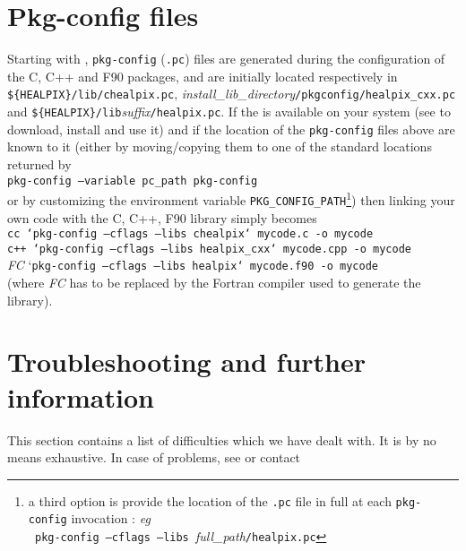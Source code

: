 \documentclass[12pt,twoside]{article}
\begin{document}
\section{Pkg-config files}
\label{sec:pkg-config}
Starting with , \texttt{pkg-config} (\texttt{.pc}) files are generated
during the configuration of the 
C, C++ and F90 packages, and are initially located respectively in
\texttt{\$\{HEALPIX\}/lib/chealpix.pc},
{\em install\_lib\_directory}\texttt{/pkgconfig/healpix\_cxx.pc}
and 
\texttt{\$\{HEALPIX\}/lib}{\em suffix}\texttt{/healpix.pc}.
If the 
is available on your system (see 
 to download, install and
use it) and if the location of
the \healpix \texttt{pkg-config} files above are known to it (either by moving/copying them
to one of the standard locations returned by \\
\texttt{pkg-config --variable pc\_path pkg-config}\\
or by customizing the environment variable \texttt{PKG\_CONFIG\_PATH}\footnote{a
third option is provide the location of the \texttt{.pc} file in full at each
\texttt{pkg-config} invocation : {\it eg}\\ {\tt
pkg-config --cflags --libs }{\em full\_path}\texttt{/healpix.pc}}) then linking
your own code with the 
C,
C++,
F90 \healpix library simply becomes \\
\texttt{cc `pkg-config --cflags --libs chealpix` mycode.c -o mycode} \\
\texttt{c++ `pkg-config --cflags --libs healpix\_cxx` mycode.cpp -o mycode} \\
{\em FC} `\texttt{pkg-config --cflags --libs healpix` mycode.f90 -o mycode}\\
(where {\em FC} has to be replaced by the Fortran compiler used to generate the
\healpix library).

\section{Troubleshooting and further information}
\label{sec:troubleshoot}
This section contains a list of difficulties which we have dealt
with. It is by no means exhaustive. 
In case of problems, see \htmladdnormallink{\tt
\healpixsupport}{\healpixsupport} or contact \healpixmail
\end{document}

